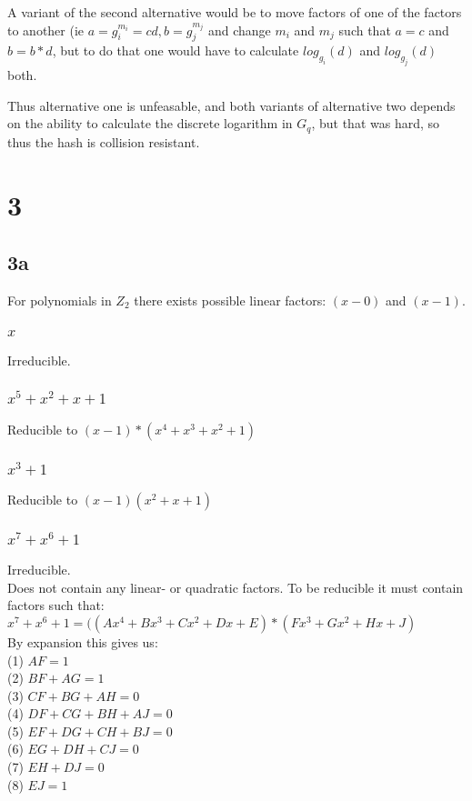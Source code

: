 \documentclass[a4paper,11pt]{article}
\begin{document}
		A variant of the second alternative would be to move factors of one of the factors to another (ie $a = g_i^{m_i} = cd, b = g_j^{m_j}$ and
		change $m_i$ and $m_j$ such that $a = c$ and $b = b*d$, but to do that one would have to calculate $log_{g_i}(d)$ and $log_{g_j}(d)$ both.

		Thus alternative one is unfeasable, and both variants of alternative two depends on the ability to calculate the discrete logarithm
		in $G_q$, but that was hard, so thus the hash is collision resistant.

	\section*{3 }
		\subsection*{3a }
			For polynomials in $Z_2$ there exists possible linear factors: $(x-0)$ and $(x-1)$.

			\subsubsection*{$x$}
				Irreducible.
			\subsubsection*{$x^5 + x^2 + x + 1$}
				Reducible to $(x - 1)*(x^4 + x^3 + x^2 + 1)$
			\subsubsection*{$x^3 + 1$}
				Reducible to $(x - 1)(x^2 + x + 1)$
			\subsubsection*{$x^7 + x^6 + 1$}
				Irreducible.\\
				Does not contain any linear- or quadratic factors. To be reducible it must contain factors such that:\\
				$x^7 + x^6 + 1 = ((Ax^4 + Bx^3 + Cx^2 + Dx + E) * (Fx^3 + Gx^2 + Hx + J)$\\
				By expansion this gives us:\\
				(1) $AF = 1$\\
				(2) $BF + AG = 1$\\
				(3) $CF + BG + AH = 0$\\
				(4) $DF + CG + BH + AJ = 0$\\
				(5) $EF + DG + CH + BJ = 0$\\
				(6) $EG + DH + CJ = 0$\\
				(7) $EH + DJ = 0$\\
				(8) $EJ = 1$\\
		
\end{document}
